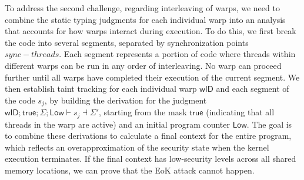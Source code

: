 






To address the second challenge, regarding interleaving of warps, we need to combine the static typing judgments  for each individual warp into an analysis that accounts for how warps interact during execution.
%
To do this, we first break the code into several segments,  separated by synchronization points $\mathit{sync-threads}$.
%
Each segment represents a portion of code where threads within different warps can be run in any order of interleaving.
%
No warp can proceed further until all warps have completed their execution of the current segment. 
%
We then establish taint tracking for each individual warp $\mathsf{wID}$ and each segment of the code $s_j$, by building the derivation for the judgment
$\mathsf{wID};\mathsf{true};  \Sigma; \mathsf{Low}\vdash s_j \dashv \Sigma'$, starting from the mask $\mathsf{true}$ (indicating that all threads in the warp are active) and an initial program counter $\mathsf{Low}$. 
%
The goal is to combine these derivations to calculate a final context for the entire program, which reflects an overapproximation of the security state when the kernel execution terminates.
%
If the final context has low-security levels across all shared memory locations, we can prove that the EoK attack cannot happen. 

